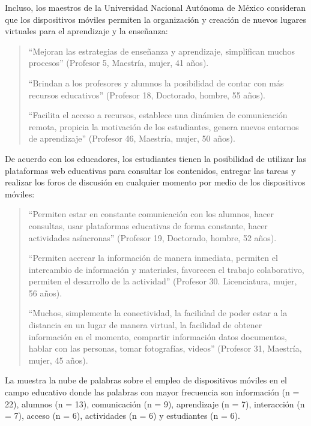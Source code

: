 \documentclass[spanish]{textolivre}
\begin{document}
Incluso, los maestros de la Universidad Nacional Autónoma de México consideran que los dispositivos móviles permiten la organización y creación de nuevos lugares virtuales para el aprendizaje y la enseñanza:

\begin{quote}
“Mejoran las estrategias de enseñanza y aprendizaje, simplifican muchos procesos” (Profesor 5, Maestría, mujer, 41 años).

“Brindan a los profesores y alumnos la posibilidad de contar con más recursos educativos” (Profesor 18, Doctorado, hombre, 55 años).

“Facilita el acceso a recursos, establece una dinámica de comunicación remota, propicia la motivación de los estudiantes, genera nuevos entornos de aprendizaje” (Profesor 46, Maestría, mujer, 50 años).
\end{quote}

De acuerdo con los educadores, los estudiantes tienen la posibilidad de utilizar las plataformas web educativas para consultar los contenidos, entregar las tareas y realizar los foros de discusión en cualquier momento por medio de los dispositivos móviles:

\begin{quote}
“Permiten estar en constante comunicación con los alumnos, hacer consultas, usar plataformas educativas de forma constante, hacer actividades asíncronas” (Profesor 19, Doctorado, hombre, 52 años).

“Permiten acercar la información de manera inmediata, permiten el intercambio de información y materiales, favorecen el trabajo colaborativo, permiten el desarrollo de la actividad” (Profesor 30. Licenciatura, mujer, 56 años).

“Muchos, simplemente la conectividad, la facilidad de poder estar a la distancia en un lugar de manera virtual, la facilidad de obtener información en el momento, compartir información datos documentos, hablar con las personas, tomar fotografías, videos” (Profesor 31, Maestría, mujer, 45 años).
\end{quote}

La  muestra la nube de palabras sobre el empleo de dispositivos móviles en el campo educativo donde las palabras con mayor frecuencia son información (n = 22), alumnos (n = 13), comunicación (n = 9), aprendizaje (n = 7), interacción (n = 7), acceso (n = 6),  actividades (n = 6) y estudiantes (n = 6).
\end{document}
